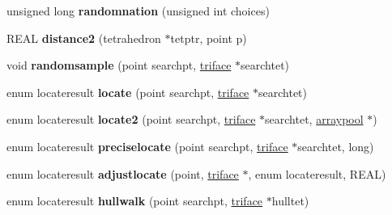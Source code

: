 \begin{DoxyCompactItemize}
\item 
\hypertarget{classtetgenmesh_a0ae35b219eb4a0d1e0c14f9759cd6563}{unsigned long {\bfseries randomnation} (unsigned int choices)}\label{classtetgenmesh_a0ae35b219eb4a0d1e0c14f9759cd6563}

\item 
\hypertarget{classtetgenmesh_ad847029808da5eacd74a4e483f5a87ed}{R\-E\-A\-L {\bfseries distance2} (tetrahedron $\ast$tetptr, point p)}\label{classtetgenmesh_ad847029808da5eacd74a4e483f5a87ed}

\item 
\hypertarget{classtetgenmesh_aa05e91020e6e60c4bc589571c64ae646}{void {\bfseries randomsample} (point searchpt, \hyperlink{classtetgenmesh_1_1triface}{triface} $\ast$searchtet)}\label{classtetgenmesh_aa05e91020e6e60c4bc589571c64ae646}

\item 
\hypertarget{classtetgenmesh_a909ae9072f70495a9dbb1ee6f0e9f151}{enum locateresult {\bfseries locate} (point searchpt, \hyperlink{classtetgenmesh_1_1triface}{triface} $\ast$searchtet)}\label{classtetgenmesh_a909ae9072f70495a9dbb1ee6f0e9f151}

\item 
\hypertarget{classtetgenmesh_af7e8c927afd56f71656ae53c047877a5}{enum locateresult {\bfseries locate2} (point searchpt, \hyperlink{classtetgenmesh_1_1triface}{triface} $\ast$searchtet, \hyperlink{classtetgenmesh_1_1arraypool}{arraypool} $\ast$)}\label{classtetgenmesh_af7e8c927afd56f71656ae53c047877a5}

\item 
\hypertarget{classtetgenmesh_a105edc0f2449781cd34c6ff077cd8a48}{enum locateresult {\bfseries preciselocate} (point searchpt, \hyperlink{classtetgenmesh_1_1triface}{triface} $\ast$searchtet, long)}\label{classtetgenmesh_a105edc0f2449781cd34c6ff077cd8a48}

\item 
\hypertarget{classtetgenmesh_a06e813e5d55032860578a3470eb211cb}{enum locateresult {\bfseries adjustlocate} (point, \hyperlink{classtetgenmesh_1_1triface}{triface} $\ast$, enum locateresult, R\-E\-A\-L)}\label{classtetgenmesh_a06e813e5d55032860578a3470eb211cb}

\item 
\hypertarget{classtetgenmesh_ae275d579989e197b795dba968c594748}{enum locateresult {\bfseries hullwalk} (point searchpt, \hyperlink{classtetgenmesh_1_1triface}{triface} $\ast$hulltet)}\label{classtetgenmesh_ae275d579989e197b795dba968c594748}


\end{DoxyCompactItemize}
